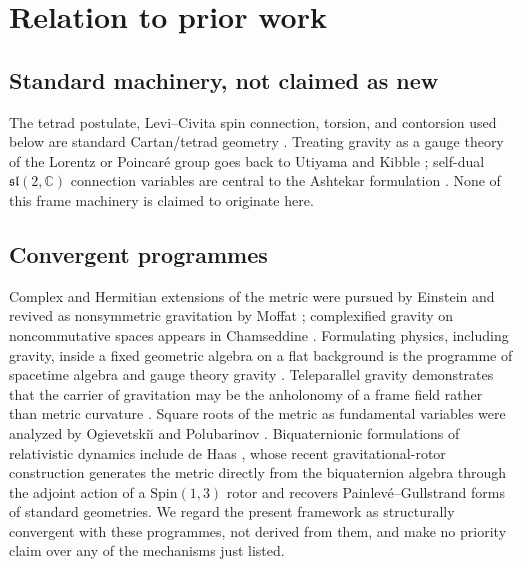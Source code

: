 \documentclass[12pt,a4paper]{article}
\theoremstyle{remark}\newtheorem{remark}[definition]{Remark}
\begin{document}
\section{Relation to prior work}
\subsection*{Standard machinery, not claimed as new}
The tetrad postulate, Levi--Civita spin connection, torsion, and contorsion
used below are standard Cartan/tetrad geometry \cite{wald1984,hehl1976}.
Treating gravity as a gauge theory of the Lorentz or Poincar\'e group goes
back to Utiyama and Kibble \cite{utiyama1956,kibble1961}; self-dual
$\mathfrak{sl}(2,\mathbb C)$ connection variables are central to the
Ashtekar formulation \cite{ashtekar1986}.  None of this frame machinery is
claimed to originate here.

\subsection*{Convergent programmes}
Complex and Hermitian extensions of the metric were pursued by Einstein
\cite{einstein1945} and revived as nonsymmetric gravitation by Moffat
\cite{moffat1979}; complexified gravity on noncommutative spaces appears in
Chamseddine \cite{chamseddine2001}.  Formulating physics, including
gravity, inside a fixed geometric algebra on a flat background is the
programme of spacetime algebra and gauge theory gravity
\cite{hestenes1966,lasenby1998}.  Teleparallel gravity demonstrates that
the carrier of gravitation may be the anholonomy of a frame field rather
than metric curvature \cite{aldrovandi2013}.  Square roots of the metric
as fundamental variables were analyzed by Ogievetski\u{\i} and
Polubarinov \cite{ogievetskii1965}.  Biquaternionic formulations of
relativistic dynamics include de Haas \cite{dehaas2014}, whose recent
gravitational-rotor construction \cite{dehaas2025} generates the metric
directly from the biquaternion algebra through the adjoint action of a
$\mathrm{Spin}(1,3)$ rotor and recovers Painlev\'e--Gullstrand forms of
standard geometries.  We regard the present framework as structurally
convergent with these programmes, not derived from them, and make no
priority claim over any of the mechanisms just listed.
\end{document}
